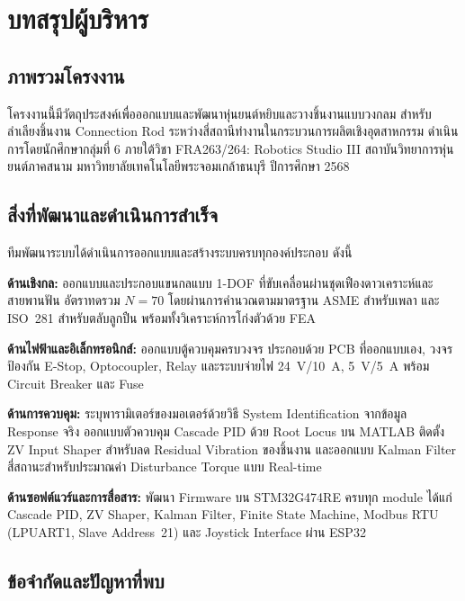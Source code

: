 
\chapter*{บทสรุปผู้บริหาร}

\section*{ภาพรวมโครงงาน}

โครงงานนี้มีวัตถุประสงค์เพื่อออกแบบและพัฒนาหุ่นยนต์หยิบและวางชิ้นงานแบบวงกลม
สำหรับลำเลียงชิ้นงาน Connection Rod ระหว่างสี่สถานีทำงานในกระบวนการผลิตเชิงอุตสาหกรรม
ดำเนินการโดยนักศึกษากลุ่มที่ 6 ภายใต้วิชา FRA263/264: Robotics Studio III
สถาบันวิทยาการหุ่นยนต์ภาคสนาม มหาวิทยาลัยเทคโนโลยีพระจอมเกล้าธนบุรี ปีการศึกษา 2568

\section*{สิ่งที่พัฒนาและดำเนินการสำเร็จ}

ทีมพัฒนาระบบได้ดำเนินการออกแบบและสร้างระบบครบทุกองค์ประกอบ ดังนี้

\textbf{ด้านเชิงกล:}
ออกแบบและประกอบแขนกลแบบ 1-DOF ที่ขับเคลื่อนผ่านชุดเฟืองดาวเคราะห์และสายพานฟัน
อัตราทดรวม $N=70$ โดยผ่านการคำนวณตามมาตรฐาน ASME สำหรับเพลา
และ ISO~281 สำหรับตลับลูกปืน พร้อมทั้งวิเคราะห์การโก่งตัวด้วย FEA

\textbf{ด้านไฟฟ้าและอิเล็กทรอนิกส์:}
ออกแบบตู้ควบคุมครบวงจร ประกอบด้วย PCB ที่ออกแบบเอง, วงจรป้องกัน E-Stop,
Optocoupler, Relay และระบบจ่ายไฟ 24~V/10~A, 5~V/5~A พร้อม Circuit Breaker และ Fuse

\textbf{ด้านการควบคุม:}
ระบุพารามิเตอร์ของมอเตอร์ด้วยวิธี System Identification จากข้อมูล Response จริง
ออกแบบตัวควบคุม Cascade PID ด้วย Root Locus บน MATLAB
ติดตั้ง ZV Input Shaper สำหรับลด Residual Vibration ของชิ้นงาน
และออกแบบ Kalman Filter สี่สถานะสำหรับประมาณค่า Disturbance Torque แบบ Real-time

\textbf{ด้านซอฟต์แวร์และการสื่อสาร:}
พัฒนา Firmware บน STM32G474RE ครบทุก module ได้แก่
Cascade PID, ZV Shaper, Kalman Filter, Finite State Machine,
Modbus RTU (LPUART1, Slave Address~21) และ Joystick Interface ผ่าน ESP32

\section*{ข้อจำกัดและปัญหาที่พบ}

